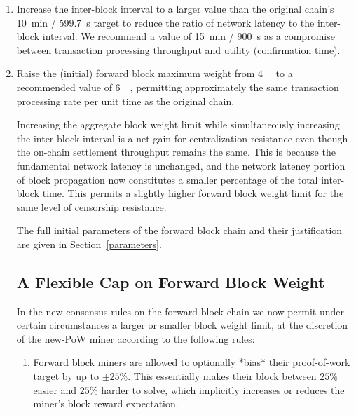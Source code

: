 \begin{enumerate}

  \item

    Increase the inter-block interval to a larger value than the
    original chain's \SI{10}{\minute} / \SI{599.7}{\second} target to
    reduce the ratio of network latency to the inter-block interval.
    We recommend a value of \SI{15}{\minute} / \SI{900}{\second} as a
    compromise between transaction processing throughput and utility
    (confirmation time).

  \item

    Raise the (initial) forward block maximum weight
    from \SI{4}{\mega\weight} to a recommended value
    of \SI{6}{\mega\weight}, permitting approximately the same
    transaction processing rate per unit time as the original chain.


Increasing the aggregate block weight limit while simultaneously
increasing the inter-block interval is a net gain for centralization
resistance even though the on-chain settlement throughput remains the
same.  This is because the fundamental network latency is unchanged,
and the network latency portion of block propagation now constitutes a
smaller percentage of the total inter-block time.  This permits a
slightly higher forward block weight limit for the same level of
censorship resistance.

The full initial parameters of the forward block chain and their
justification are given in Section~\ref{parameters}.

\subsection{A Flexible Cap on Forward Block Weight}

In the new consensus rules on the forward block chain we now permit
under certain circumstances a larger or smaller block weight limit, at
the discretion of the new-PoW miner according to the following rules:

\begin{enumerate}

  \item

    Forward block miners are allowed to optionally *bias* their
    proof-of-work target by up to $\pm 25\%$.  This essentially makes
    their block between $25\%$ easier and $25\%$ harder to solve,
    which implicitly increases or reduces the miner's block reward
    expectation.


\end{enumerate}
\end{enumerate}
